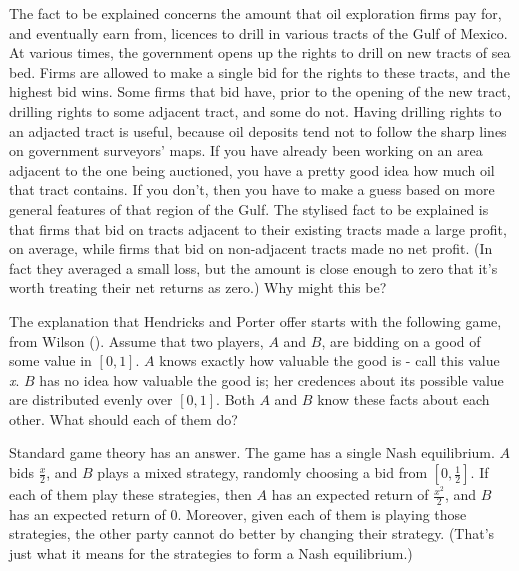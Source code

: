 \documentclass[
  10pt,
  letterpaper,
  DIV=11,
  numbers=noendperiod,
  twoside]{scrartcl}
\begin{document}
The fact to be explained concerns the amount that oil exploration firms
pay for, and eventually earn from, licences to drill in various tracts
of the Gulf of Mexico. At various times, the government opens up the
rights to drill on new tracts of sea bed. Firms are allowed to make a
single bid for the rights to these tracts, and the highest bid wins.
Some firms that bid have, prior to the opening of the new tract,
drilling rights to some adjacent tract, and some do not. Having drilling
rights to an adjacted tract is useful, because oil deposits tend not to
follow the sharp lines on government surveyors' maps. If you have
already been working on an area adjacent to the one being auctioned, you
have a pretty good idea how much oil that tract contains. If you don't,
then you have to make a guess based on more general features of that
region of the Gulf. The stylised fact to be explained is that firms that
bid on tracts adjacent to their existing tracts made a large profit, on
average, while firms that bid on non-adjacent tracts made no net profit.
(In fact they averaged a small loss, but the amount is close enough to
zero that it's worth treating their net returns as zero.) Why might this
be?

The explanation that Hendricks and Porter offer starts with the
following game, from Wilson (). Assume
that two players, \(A\) and \(B\), are bidding on a good of some value
in \([0, 1]\). \(A\) knows exactly how valuable the good is - call this
value \emph{x}. \(B\) has no idea how valuable the good is; her
credences about its possible value are distributed evenly over
\([0, 1]\). Both \(A\) and \(B\) know these facts about each other. What
should each of them do?

Standard game theory has an answer. The game has a single Nash
equilibrium. \(A\) bids \(\frac{x}{2}\), and \(B\) plays a mixed
strategy, randomly choosing a bid from \([0, \frac{1}{2}]\). If each of
them play these strategies, then \(A\) has an expected return of
\(\frac{x^2}{2}\), and \(B\) has an expected return of 0. Moreover,
given each of them is playing those strategies, the other party cannot
do better by changing their strategy. (That's just what it means for the
strategies to form a Nash equilibrium.)
\end{document}
